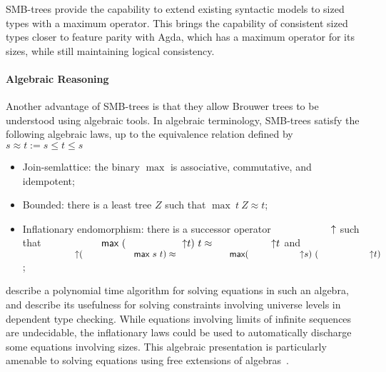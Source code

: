 SMB-trees provide the capability to extend existing syntactic models to sized types
with a maximum operator.
This brings the capability of consistent sized types closer to feature parity with Agda,
which has a maximum operator for its sizes,
while still maintaining logical consistency.

\paragraph{Algebraic Reasoning}
Another advantage of SMB-trees is that they allow Brouwer trees to
be understood using algebraic tools.
In algebraic terminology, SMB-trees satisfy the following algebraic laws, up to the equivalence relation defined by $s \approx t := s \le t \le s $
\begin{itemize}
  \item Join-semlattice: the binary $\max$ is associative, commutative, and idempotent;
  \item Bounded: there is a least tree $Z$ such that $\max\ t\ Z \approx t$;
  \item Inflationary endomorphism: there is a successor operator $\up$
        such that ${\max\ (\up t)\ t \approx \up t}$
        and\\ ${\up (\max\ s\ t) \approx \max (\up s)\ (\up t)}$;
\end{itemize}

 describe a polynomial time algorithm for solving equations in such an algebra,
and describe its usefulness for solving constraints involving universe levels
in dependent type checking. While equations involving limits of infinite sequences
are undecidable, the inflationary laws could be used to automatically discharge some equations involving sizes. This algebraic presentation is particularly
amenable to solving equations using free extensions of algebras~\citep{corbyn:proof-synthesis,allais2023frex}.


